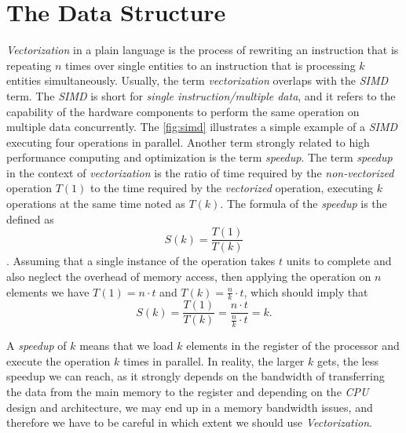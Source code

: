 \section{The Data Structure}

\emph{Vectorization} in a plain language is the process of rewriting an instruction that is repeating $n$ times over single entities to an instruction that is processing $k$ entities simultaneously. Usually, the term \emph{vectorization} overlaps with the \emph{SIMD} term. The \emph{SIMD} is short for \emph{single instruction/multiple data}, and it refers to the capability of the hardware components to perform the same operation on multiple data concurrently. The \autoref{fig:simd} illustrates a simple example of a \emph{SIMD} executing  four operations in parallel. Another term strongly related to high performance computing and optimization is the term \emph{speedup}. The term \emph{speedup} in the context of \emph{vectorization} is the ratio of time required by the \emph{non-vectorized} operation $T(1)$ to the time required by the \emph{vectorized} operation, executing $k$ operations at the same time noted as $T(k)$. The formula of the \emph{speedup} is the defined as $$S(k) = \frac{T(1)}{T(k)}$$. Assuming that a single instance of the operation takes $t$ units to complete and also neglect the overhead of memory access, then applying the operation on $n$ elements we have $T(1) = n \cdot t$ and $T(k) = \frac{n}{k} \cdot t$, which should imply that $$S(k) = \frac{T(1)}{T(k)} = \frac{n \cdot t}{\frac{n}{k} \cdot t} = k.$$

A \emph{speedup} of $k$ means that we load $k$ elements in the register of the processor and execute the operation $k$ times in parallel. In reality, the larger $k$ gets, the less speedup we can reach, as it strongly depends on the bandwidth of transferring the data from the main memory to the register and depending on the \emph{CPU} design and architecture, we may end up in a memory bandwidth issues, and therefore we have to be careful in which extent we should use  \emph{Vectorization}.\\




